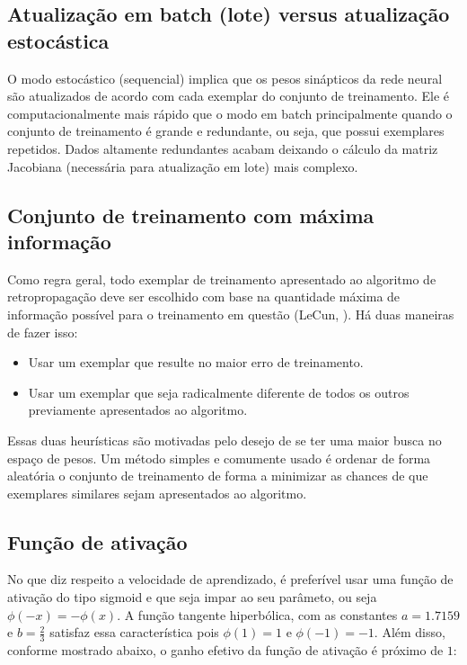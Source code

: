 \subsection{Atualização em batch (lote) versus atualização estocástica}
O modo estocástico (sequencial) implica que os pesos sinápticos da rede neural são atualizados de acordo com cada exemplar do conjunto de treinamento. Ele é computacionalmente mais rápido que o modo em batch principalmente quando o conjunto de treinamento é grande e redundante, ou seja, que possui exemplares repetidos. Dados altamente redundantes acabam deixando o cálculo da matriz Jacobiana (necessária para atualização em lote) mais complexo.

\subsection{Conjunto de treinamento com máxima informação}
Como regra geral, todo exemplar de treinamento apresentado ao algoritmo de retropropagação deve ser escolhido com base na quantidade máxima de informação possível para o treinamento em questão (LeCun, \citeyear{lecun1993efficient}). Há duas maneiras de fazer isso:

\begin{itemize}
    \item Usar um exemplar que resulte no maior erro de treinamento.
    
    \item Usar um exemplar que seja radicalmente diferente de todos os outros previamente apresentados ao algoritmo.
\end{itemize}

Essas duas heurísticas são motivadas pelo desejo de se ter uma maior busca no espaço de pesos. Um método simples e comumente usado é ordenar de forma aleatória o conjunto de treinamento de forma a minimizar as chances de que exemplares similares sejam apresentados ao algoritmo. 

\subsection{Função de ativação}
No que diz respeito a velocidade de aprendizado, é preferível usar uma função de ativação do tipo sigmoid e que seja impar ao seu parâmeto, ou seja $\phi(-x)=-\phi(x)$. A função tangente hiperbólica, com as constantes $a=1.7159$ e $b=\frac{2}{3}$  satisfaz essa característica pois $\phi(1)=1$ e $\phi(-1)=-1$. Além disso, conforme mostrado abaixo, o ganho efetivo da função de ativação é próximo de $1$:

